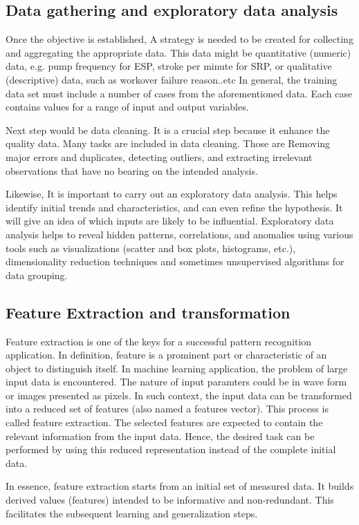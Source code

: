 \subsection{Data gathering and exploratory data analysis}
Once the objective is established, A strategy is needed to be created for collecting and aggregating the appropriate data. This data might be quantitative (numeric) data, e.g. pump frequency for \ac{ESP}, stroke per minute for \ac{SRP}, or qualitative (descriptive) data, such as workover failure reason..etc In general, the training data set must include a number of cases from the aforementioned data. Each case contains values for a range of input and output variables.

Next step would be data cleaning. It is a crucial step because it enhance the quality data. Many tasks are included in data cleaning. Those are Removing major errors and duplicates, detecting outliers, and extracting irrelevant observations that have no bearing on the intended analysis. 

Likewise, It is important to carry out an exploratory data analysis. This helps identify initial trends and characteristics, and can even refine the hypothesis. It will give an idea of which inputs are likely to be influential. Exploratory data analysis helps to reveal hidden patterns, correlations, and anomalies using various tools such as visualizations (scatter and box plots, histograms, etc.), dimensionality reduction techniques and sometimes unsupervised algorithms for data grouping.

\subsection{Feature Extraction and transformation}
Feature extraction is one of the keys for a successful pattern recognition application. In definition, feature is a prominent part or characteristic of an object to distinguish itself. In machine learning application, the problem of large input data is encountered. The nature of input paramters could be in wave form or images presented as pixels. In such context, the input data can be transformed into a reduced set of features (also named a features vector). This process is called feature extraction. The selected features are expected to contain the relevant information from the input data. Hence, the desired task can be performed by using this reduced representation instead of the complete initial data.

In essence, feature extraction starts from an initial set of measured data. It builds derived values (features) intended to be informative and non-redundant. This facilitates the subsequent learning and generalization steps. 

